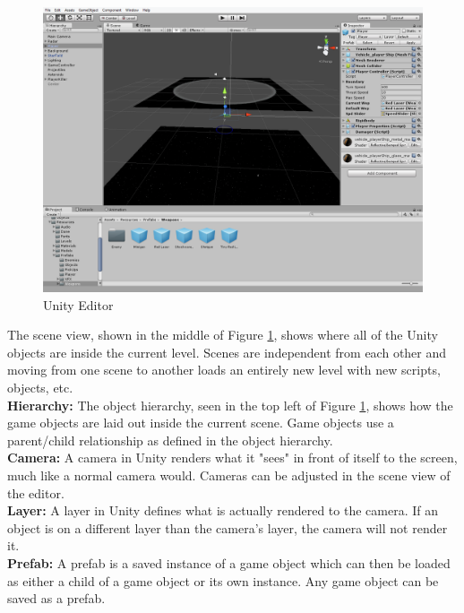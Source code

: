 \documentclass[12pt]{article}       %
\def\hs{\hspace{15pt}}
\begin{document}
\begin{figure} [H]
\centering
\includegraphics[width=7in]{scene.png}
\caption{Unity Editor} \label{Unity}
\end{figure}

\hs {\bf Scene:} The scene view, shown in the middle of Figure \ref{Unity}, shows where all of the Unity objects are inside the current level. Scenes are independent from each other and moving from one scene to another loads an entirely new level with new scripts, objects, etc.\\

{\bf Hierarchy:} The object hierarchy, seen in the top left of Figure \ref{Unity}, shows how the game objects are laid out inside the current scene. Game objects use a parent/child relationship as defined in the object hierarchy.\\

{\bf Camera:} A camera in Unity renders what it "sees" in front of itself to the screen, much like a normal camera would. Cameras can be adjusted in the scene view of the editor.\\

{\bf Layer:} A layer in Unity defines what is actually rendered to the camera. If an object is on a different layer than the camera's layer, the camera will not render it.\\

{\bf Prefab:} A prefab is a saved instance of a game object which can then be loaded as either a child of a game object or its own instance. Any game object can be saved as a prefab.
\end{document}
